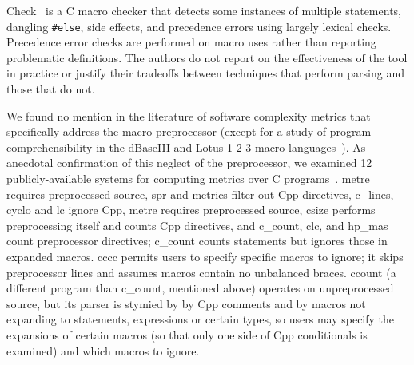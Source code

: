 \documentclass[10pt]{article}
\newcommand{\pkg}[1]{\textsf{#1}}
\begin{document}
Check~\cite{SpulerS92} is a C macro checker that detects some instances of multiple
statements, dangling {\tt \#else}, side effects, and precedence errors
using largely lexical checks.  Precedence error checks are
performed on macro uses rather than reporting problematic definitions.  The
authors do not report on the effectiveness of the tool in practice or
justify their tradeoffs between techniques that perform parsing and those
that do not.


We found no mention in the literature of software complexity metrics that
specifically address the macro preprocessor (except for a study of program
comprehensibility in the dBaseIII and Lotus 1-2-3 macro
languages~\cite{DavisDL90}).  As anecdotal confirmation of this neglect of
the preprocessor, we examined 12 publicly-available systems for computing
metrics over C programs~\cite{Lott-metrics-tools}.
\pkg{metre} requires preprocessed source, \pkg{spr} and \pkg{metrics}
filter out Cpp directives, \pkg{c\_lines}, \pkg{cyclo} and \pkg{lc} ignore
Cpp, \pkg{metre} requires preprocessed source, \pkg{csize} performs
preprocessing itself and counts Cpp directives, and \pkg{c\_count},
\pkg{clc}, and \pkg{hp\_mas} count preprocessor directives;
\pkg{c\_count} counts statements but ignores those in expanded macros.
\pkg{cccc} permits users to specify specific macros to ignore; it skips
preprocessor lines and assumes macros contain no unbalanced braces.
\pkg{ccount} (a different program than \pkg{c\_count}, mentioned above) operates on unpreprocessed source, but its parser is stymied
by by Cpp comments and by macros not expanding to statements, expressions
or certain types, so users may specify the expansions of certain macros (so
that only one side of Cpp conditionals is examined) and which macros to
ignore.

\end{document}
